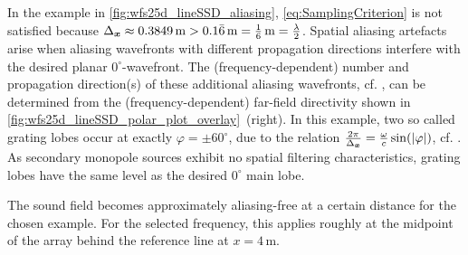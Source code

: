 In the example in \myfig\ref{fig:wfs25d_lineSSD_aliasing},
\myeq\eqref{eq:SamplingCriterion} is not satisfied because
$\Delta_{\bm{x}}\approx 0{.}3849\,\text{m} > 0{.}1\bar{6}\,\text{m} = \frac{1}{6}\,\text{m} = \frac{\lambda}{2}$.
%
Spatial aliasing artefacts arise when aliasing wavefronts
with different propagation directions interfere with the desired planar
$0^\circ$-wavefront.
%
The (frequency-dependent) number and propagation direction(s) of these
additional aliasing wavefronts, cf.
\cite{Stenzel1927,Berkhout1993_JASA,Start1997_diss,Winter2019_diss},
can be determined from the (frequency-dependent) far-field
directivity shown in \myfig\ref{fig:wfs25d_lineSSD_polar_plot_overlay}~(right).
%
In this example, two so called grating lobes
occur at exactly $\varphi=\pm 60^\circ$, due to the relation
$\frac{2\pi}{\Delta_{\bm{x}}} = \frac{\omega}{c} \sin(|\varphi|)$,
cf. \cite[Ch.~2.4]{Trees2002_book}.
As secondary monopole sources exhibit no spatial filtering characteristics,
grating lobes have the same level as the desired $0^\circ$ main lobe.



The sound field becomes approximately aliasing-free
at a certain distance for the chosen example.
For the selected frequency, this applies roughly at the midpoint of the
array behind the reference line at $x=4$\,m.



